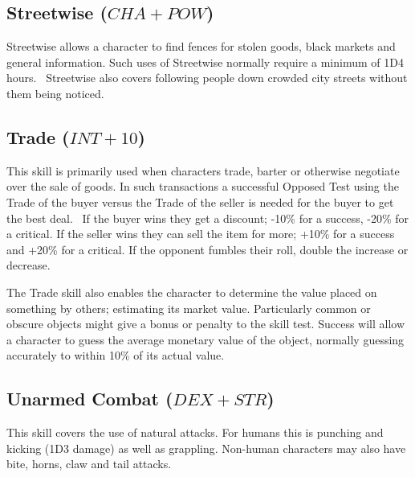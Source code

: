 \subsection{Streetwise ($CHA+POW$)}
Streetwise allows a character to find fences for stolen goods, black markets and general information. Such uses of Streetwise normally require a minimum of 1D4 hours.  Streetwise also covers following people down crowded city streets without them being noticed.

\subsection{Trade ($INT+10$)}
\label{ssec:trade}
This skill is primarily used when characters trade, barter or otherwise negotiate over the sale of goods. In such transactions a successful Opposed Test using the Trade of the buyer versus the Trade of the seller is needed for the buyer to get the best deal.  If the buyer wins they get a discount; -10\% for a success, -20\% for a critical. If the seller wins they can sell the item for more; +10\% for a success and +20\% for a critical. If the opponent fumbles their roll, double the increase or decrease.

The Trade skill also enables the character to determine the value placed on something by others; estimating its market value. Particularly common or obscure objects might give a bonus or penalty to the skill test. Success will allow a character to guess the average monetary value of the object, normally guessing accurately to within 10\% of its actual value.  


\subsection{Unarmed Combat ($DEX+STR$)}
This skill covers the use of natural attacks. For humans this is punching and kicking (1D3 damage) as well as grappling. Non-human characters may also have bite, horns, claw and tail attacks. 


